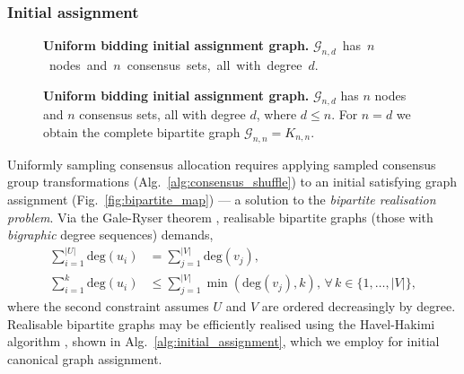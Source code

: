 \subsubsection{Initial assignment} \label{sec:initial_graph_assignment}

\begin{figure}[!htb]
	\centering
	\resizebox{0.75\columnwidth}{!}{
		
	}
	\caption{\textbf{Uniform bidding initial assignment graph.} \mbox{$\mathcal{G}_{n,d}$ has $n$ nodes and $n$ consensus sets, all with degree $d$.}}\label{fig:butterfly_graph}
\end{figure}

\begin{figure}[!htb]
	\centering
	
	\hfill
	
	\hfill
	
	\caption{\textbf{Uniform bidding initial assignment graph.} \mbox{$\mathcal{G}_{n,d}$} has $n$ nodes and $n$ consensus sets, all with degree $d$, where \mbox{$d\leq n$}. For \mbox{$n=d$} we obtain the complete bipartite graph \mbox{$\mathcal{G}_{n,n}=K_{n,n}$.}}\label{fig:butterfly_graph_comp}
\end{figure}

Uniformly sampling consensus allocation requires applying sampled consensus group transformations (Alg.~\ref{alg:consensus_shuffle}) to an initial satisfying graph assignment (Fig.~\ref{fig:bipartite_map}) --- a solution to the \emph{bipartite realisation problem}. Via the Gale-Ryser theorem \cite{Gale1957, Ryser1957}, realisable bipartite graphs (those with \emph{bigraphic} degree sequences) demands,
\begin{align} \label{eq:bipartite_real}
	\sum_{i=1}^{|U|} \mathrm{deg}(u_i) & = \sum_{j=1}^{|V|} \mathrm{deg}(v_j),                                                     \\
	\sum_{i=1}^k \mathrm{deg}(u_i)     & \leq \sum_{j=1}^{|V|} \min(\mathrm{deg}(v_j),k),\,\forall\, k\in\{1,\dots,|V|\},\nonumber
\end{align}
where the second constraint assumes $U$ and $V$ are ordered decreasingly by degree. Realisable bipartite graphs may be efficiently realised using the Havel-Hakimi algorithm \cite{Havel1955, Hakimi62}, shown in Alg.~\ref{alg:initial_assignment}, which we employ for initial canonical graph assignment.


